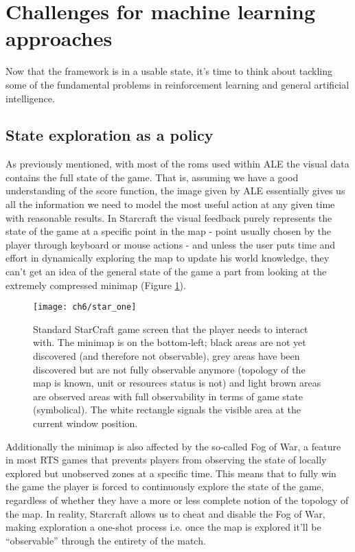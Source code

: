 \section{Challenges for machine learning approaches}

Now that the framework is in a usable state, it's time to think about tackling
some of the fundamental problems in reinforcement learning and general
artificial intelligence.

\subsection{State exploration as a policy}
As previously mentioned, with most of the roms used within ALE the visual data
contains the full state of the game. That is, assuming we have a good
understanding of the score function, the image given by ALE essentially gives us
all the information we need to model the most useful action at any given time
with reasonable results. In Starcraft the visual feedback purely represents the
state of the game at a specific point in the map - point usually chosen by the
player through keyboard or mouse actions - and unless the user puts time and
effort in dynamically exploring the map to update his world knowledge, they
can't get an idea of the general state of the game a part from looking at the
extremely compressed minimap (Figure \ref{fig:one_star}).

\begin{figure}[h]
    \centering
    \texttt{[image: ch6/star\_one]}
    \caption{Standard StarCraft game screen that the player needs to interact
      with. The minimap is on the bottom-left; black areas are not yet
      discovered (and therefore not observable), grey areas have been discovered
      but are not fully observable anymore (topology of the map is known, unit
      or resources status is not) and light brown areas are observed areas with
      full observability in terms of game state (symbolical). The white
      rectangle signals the visible area at the current window position.}
    \label{fig:one_star}
\end{figure}

Additionally the minimap is also affected by the so-called Fog of War, a feature
in most RTS games that prevents players from observing the state of locally
explored but unobserved zones at a specific time. This means that to fully win
the game the player is forced to continuously explore the state of the game,
regardless of whether they have a more or less complete notion of the topology
of the map. In reality, Starcraft allows us to cheat and disable the Fog of War,
making exploration a one-shot process i.e. once the map is explored it’ll be
“observable” through the entirety of the match.

